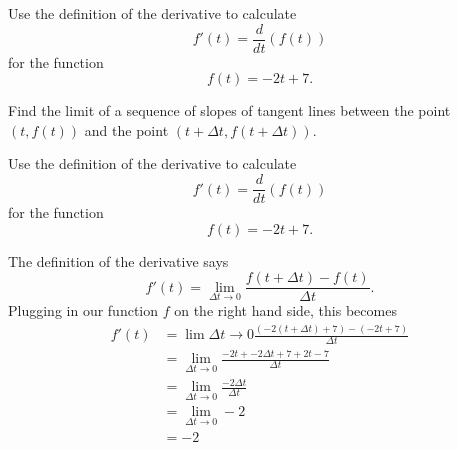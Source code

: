 \documentclass{ximera}
\author{Emma Smith Zbarsky}
\begin{document}
\begin{exercise}

Use the definition of the derivative to calculate
\[f'(t) = \frac{d}{dt}(f(t))\] for the function \[f(t) = -2t+7.\]


\begin{hint}
Find the limit of a sequence of slopes of tangent lines between the
point $(t, f(t))$ and the point $(t+\Delta t, f(t+\Delta t))$.
\end{hint}


\begin{hint}
Use the definition of the derivative to calculate
\[f'(t) = \frac{d}{dt}(f(t))\] for the function \[f(t) = -2t+7.\]

The definition of the derivative says
\[f'(t) = \lim_{\Delta t \to 0} \frac{f(t+\Delta t)-f(t)}{\Delta t}.\]
Plugging in our function $f$ on the right hand side, this becomes
\begin{align*} f'(t) & = \lim{\Delta t \to 0} \frac{\left(-2(t+\Delta t)+7\right)-\left(-2t+7\right)}{\Delta t} \\
&= \lim_{\Delta t \to 0} \frac{-2t+-2\Delta t +7 + 2t -7}{\Delta t} \\
&= \lim_{\Delta t \to 0} \frac{-2\Delta t}{\Delta t} \\
&= \lim_{\Delta t \to 0} -2
\\ & = \boxed{-2}\end{align*}
\end{hint}


\begin{multipleChoice}
\end{multipleChoice}

\end{exercise}
\end{document}
